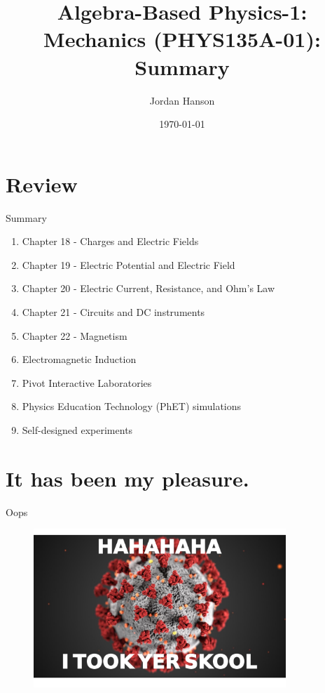 \documentclass{beamer}
\title{Algebra-Based Physics-1: Mechanics (PHYS135A-01): Summary}
\date{\today}
\author{Jordan Hanson}
\institute{Whittier College Department of Physics and Astronomy}
\begin{document}
\maketitle

\section{Review}

\begin{frame}{Summary}
\begin{enumerate}
\item Chapter 18 - Charges and Electric Fields
\item Chapter 19 - Electric Potential and Electric Field
\item Chapter 20 - Electric Current, Resistance, and Ohm's Law
\item Chapter 21 - Circuits and DC instruments
\item Chapter 22 - Magnetism
\item Electromagnetic Induction
\item Pivot Interactive Laboratories
\item Physics Education Technology (PhET) simulations
\item Self-designed experiments
\end{enumerate}
\end{frame}

\section{It has been my pleasure.}

\begin{frame}{Oops}
\begin{figure}
\includegraphics[width=0.85\textwidth]{savage.pdf}
\end{figure}
\end{frame}
\end{document}
